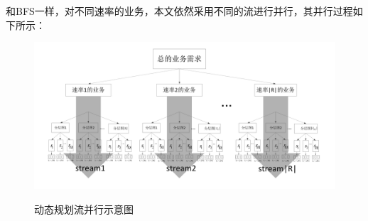 和BFS一样，对不同速率的业务，本文依然采用不同的流进行并行，其并行过程如下所示：
\begin{figure}
\setlength{\belowcaptionskip}{-0.5cm}
\begin{center}
{\includegraphics[width=1 \textwidth]{figures/BBK.pdf}}
\end{center}
\caption{{\footnotesize{动态规划流并行示意图}}}
\label{prof}
\end{figure}
